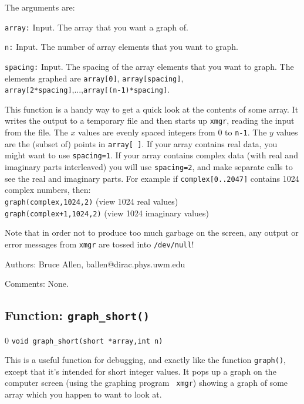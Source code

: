 The arguments are:
\begin{description}
\item{\tt array:} Input.  The array that you want a graph of.
\item{\tt n:} Input.  The number of array elements that you want to graph.
\item{\tt spacing:} Input.  The spacing of the array elements that you want
   to graph.  The elements graphed are {\tt array[0]}, {\tt array[spacing]},
   {\tt array[2*spacing]},...,{\tt array[(n-1)*spacing]}.
\end{description}

This function is a handy way to get a quick look at the contents of
some array.  It writes the output to a temporary file and then starts
up {\tt xmgr}, reading the input from the file.  The $x$ values are
evenly spaced integers from $0$ to {\tt n-1}.  The $y$ values are the
(subset of) points in {\tt array[ ]}.  If your array contains real
data, you might want to use {\tt spacing=1}.  If your array contains
complex data (with real and imaginary parts interleaved) you will use
{\tt spacing=2}, and make separate calls to see the real and imaginary
parts. For example if {\tt complex[0..2047]} contains 1024 complex
numbers, then:\\
{\tt graph(complex,1024,2)} (view 1024 real values)\\
{\tt graph(complex+1,1024,2)} (view 1024 imaginary values)

Note that in order not to produce too much garbage on the screen,
any output or error messages from {\tt xmgr} are tossed into 
{\tt /dev/null}!
\begin{description}
\item{Authors:}
Bruce Allen, ballen@dirac.phys.uwm.edu
\item{Comments:}
None.
\end{description}
\clearpage

\subsection{Function: {\tt graph\_short()}}
\setcounter{equation}0
{\tt void graph\_short(short *array,int n)}

This is a useful function for debugging, and exactly like the function
{\tt graph()}, except that it's intended for short integer values.  It
pops up a graph on the computer screen (using the graphing program {\tt
xmgr}) showing a graph of some array which you happen to want to look
at.

